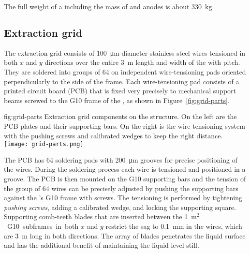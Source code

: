 The full weight of a  including the mass of  and anodes is about \SI{330}{kg}.

\subsection{Extraction grid}
\label{sec:fddp-crp-grid}
The extraction grid consists of \SI{100}{\micro\meter}-diameter stainless steel wires tensioned in both $x$ and $y$ directions over the entire \SI{3}{m} length and width of the  with \dpstrippitch pitch. They are soldered into groups of \num{64} on independent wire-tensioning pads oriented perpendicularly to the side of the  frame. Each wire-tensioning pad consists of a printed circuit board (PCB)  that is fixed very precisely to mechanical support beams screwed to the G10 frame of the , as shown in Figure~\ref{fig:grid-parts}.
 
\begin{dunefigure}{fig:grid-parts}
{Extraction grid components on the  structure. On the left are the PCB plates and their supporting bars. On the right is the %
wire tensioning system with the pushing screws and calibrated wedges to keep the right distance.}
\texttt{[image: grid-parts.png]}
\end{dunefigure}

The PCB has \num{64} soldering pads with \SI{200}{\micro\meter} grooves for precise positioning of the wires. During the %
soldering process each wire is tensioned and positioned in a groove. The PCB is then mounted on the G10 supporting bars and the tension of the group of \num{64} wires can be precisely adjusted by pushing the supporting bars against the ’s G10 frame with screws. The tensioning is performed by tightening \textit{pushing screws}, adding a calibrated wedge, and locking the supporting square.
Supporting comb-teeth blades that are inserted between the \SI{1}{m$^2$} G10 subframes in both $x$ and $y$ restrict the sag to \SI{0.1}{mm} in the wires, which are \SI{3}{m} long in both directions. The array of blades penetrates the liquid surface and has the additional benefit of maintaining the liquid level still.

